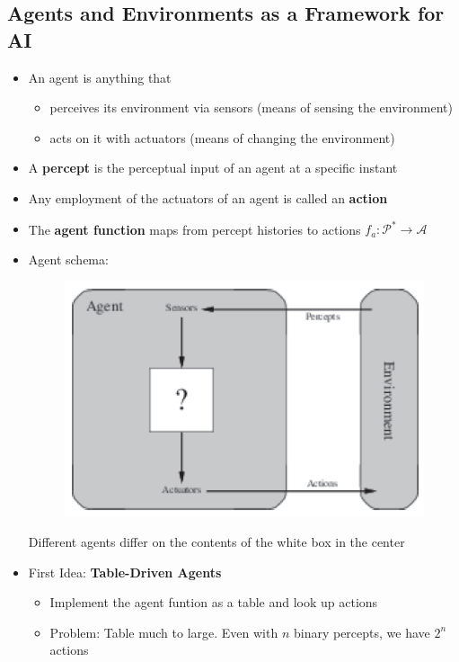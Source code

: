 \documentclass{scrartcl}
\begin{document}
\subsection{Agents and Environments as a Framework for AI}
\begin{itemize}
    \item
        An agent is anything that
        \begin{itemize}
            \item
                perceives its environment via sensors (means of sensing the environment)
            \item
                acts on it with actuators (means of changing the environment)
        \end{itemize}
    \item
        A \textbf{percept} is the perceptual input of an agent at a specific instant
    \item
        Any employment of the actuators of an agent is called an \textbf{action}
    \item
        The \textbf{agent function} maps from percept histories to actions $f_a: \mathcal{P}^* \rightarrow \mathcal{A}$ 
    \item
        Agent schema:
        \begin{figure}[H]
            \centering
            \includegraphics[scale=0.8]{figures/38}
        \end{figure}
        Different agents differ on the contents of the white box in the center
    \item
        First Idea: \textbf{Table-Driven Agents}
        \begin{itemize}
            \item
                Implement the agent funtion as a table and look up actions
            \item
                Problem: Table much to large. Even with $n$ binary percepts, we have $2^n$ actions
        \end{itemize}
\end{itemize}
\end{document}
